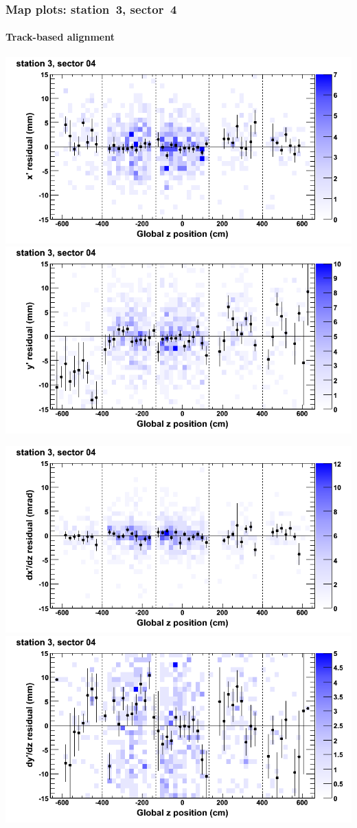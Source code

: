 \documentclass[compress]{beamer}
\begin{document}
\begin{frame}
\frametitle{Map plots: station~3, sector~4}
\framesubtitle{Track-based alignment}
\includegraphics[width=0.5\linewidth]{mapplots_re05/DTvsz_st3sec04_x.png}
\includegraphics[width=0.5\linewidth]{mapplots_re05/DTvsz_st3sec04_y.png}

\includegraphics[width=0.5\linewidth]{mapplots_re05/DTvsz_st3sec04_dxdz.png}
\includegraphics[width=0.5\linewidth]{mapplots_re05/DTvsz_st3sec04_dydz.png}
\end{frame}
\end{document}
